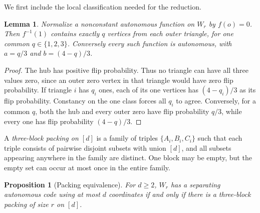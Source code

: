 \documentclass[11pt]{article}
\newtheorem{lemma}[theorem]{Lemma}
\newtheorem{proposition}[theorem]{Proposition}
\theoremstyle{definition}
\numberwithin{equation}{section}
\begin{document}
We first include the local classification needed for the reduction.

\begin{lemma}\label{lem:coordinates}
Normalize a nonconstant autonomous function on $W_r$ by $f(o)=0$.
Then $f^{-1}(1)$ contains exactly $q$ vertices from each outer triangle,
for one common $q\in\{1,2,3\}$. Conversely every such function is
autonomous, with $a=q/3$ and $b=(4-q)/3$.
\end{lemma}

\begin{proof}
The hub has positive flip probability. Thus no triangle can have all
three values zero, since an outer zero vertex in that triangle would
have zero flip probability. If triangle $i$ has $q_i$ ones, each of its
one vertices has $(4-q_i)/3$ as its flip probability. Constancy on the
one class forces all $q_i$ to agree. Conversely, for a common $q$, both
the hub and every outer zero have flip probability $q/3$, while every
one has flip probability $(4-q)/3$.
\end{proof}

A \emph{three-block packing on $[d]$} is a family of triples
$\{A_i,B_i,C_i\}$ such that each triple consists of pairwise disjoint
subsets with union $[d]$, and all subsets appearing anywhere in the
family are distinct. One block may be empty, but the empty set can occur
at most once in the entire family.

\begin{proposition}[Packing equivalence]\label{prop:packing}
For $d\geq2$, $W_r$ has a separating autonomous code using at most $d$
coordinates if and only if there is a three-block packing of size $r$
on $[d]$.
\end{proposition}
\end{document}
